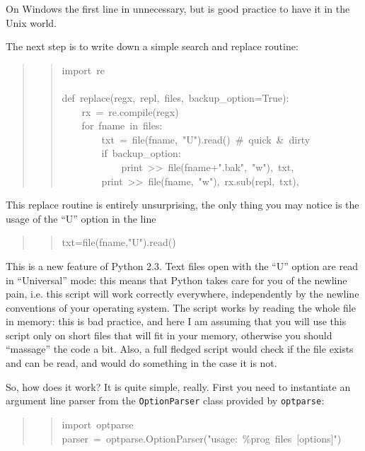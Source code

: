 \documentclass[10pt,a4paper,english]{article}
\begin{document}
On Windows the first line in unnecessary, but is good practice to have it 
in the Unix world.

The next step is to write down a simple search and replace routine:
\begin{quote}
\begin{quote}{\ttfamily \raggedright \noindent
import~re~\\
~\\
def~replace(regx,~repl,~files,~backup{\_}option=True):~\\
~~~~rx~=~re.compile(regx)~\\
~~~~for~fname~in~files:~\\
~~~~~~~~txt~=~file(fname,~"U").read()~{\#}~quick~{\&}~dirty~\\
~~~~~~~~if~backup{\_}option:~\\
~~~~~~~~~~~~print~>{}>~file(fname+".bak",~"w"),~txt,~\\
~~~~~~~~print~>{}>~file(fname,~"w"),~rx.sub(repl,~txt),
}\end{quote}
\end{quote}

This replace routine is entirely unsurprising, the only thing you
may notice is the usage of the ``U'' option in the line
\begin{quote}
\begin{quote}{\ttfamily \raggedright \noindent
txt=file(fname,"U").read()
}\end{quote}
\end{quote}

This is a new feature of Python 2.3. Text files open with the ``U''
option are read in ``Universal'' mode: this means that Python takes
care for you of the newline pain, i.e. this script will work 
correctly everywhere, independently by the newline
conventions of your operating system. The script works by reading 
the whole file in memory: this is bad practice, and here I am assuming 
that you will use this script only on short files that will fit in 
your memory, otherwise you should ``massage'' the code a bit.
Also, a full fledged script would check if the file exists 
and can be read, and would do something in the case it is not.

So, how does it work? It is quite simple, really. 
First you need to instantiate an argument line parser from
the \texttt{OptionParser} class provided by \texttt{optparse}:
\begin{quote}
\begin{quote}{\ttfamily \raggedright \noindent
import~optparse~~\\
parser~=~optparse.OptionParser("usage:~{\%}prog~files~{[}options]")
}\end{quote}
\end{quote}
\end{document}
